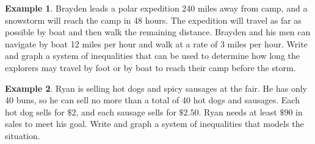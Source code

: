 \documentclass{report}
\theoremstyle{definition}
\newtheorem{example}{\bf Example}
\begin{document}
 \newpage

\begin{example}
Brayden leads a polar expedition 240 miles away from camp, and a snowstorm will reach the camp in 48 hours. The expedition will travel as far as possible by boat and then walk the remaining distance. Brayden and his men can navigate by boat 12 miles per hour and walk at a rate of 3 miles per hour. Write and graph a system of inequalities that can be used to determine how long the explorers may travel by foot or by boat to reach their camp before the storm. 
\end{example}

\begin{flushright}
\end{flushright}

\begin{example}
Ryan is selling hot dogs and spicy sausages at the fair. He has only 40 buns, so he can sell no more than a total of 40 hot dogs and sausages. Each hot dog sells for $\$2$, and each sausage sells for $\$2.50$. Ryan needs at least $\$90$ in sales to meet his goal. Write and graph a system of inequalities that models the situation.
\end{example}
\end{document}
